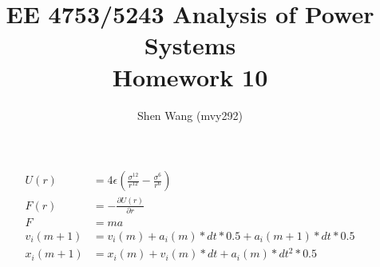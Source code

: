 \documentclass{article}
\begin{document}
	\title{EE 4753/5243 Analysis of Power Systems\\
		Homework 10}
	\author{Shen Wang (mvy292)}
	\maketitle
\begin{align*}
U(r) &= 4 \epsilon (\frac{\sigma^{12}}{r^{12}} - \frac{\sigma^6}{r^6})\\
F(r) &= -\frac{\partial U(r)}{\partial r}\\
F &= ma\\
v_i(m+1) &= v_i(m)+a_i(m)*dt*0.5+a_i(m+1)*dt*0.5\\
x_i(m+1) &= x_i(m)+v_i(m)*dt+a_i(m)*dt^2*0.5
\end{align*}
\begin{flushleft}

\end{flushleft}
\end{document}
